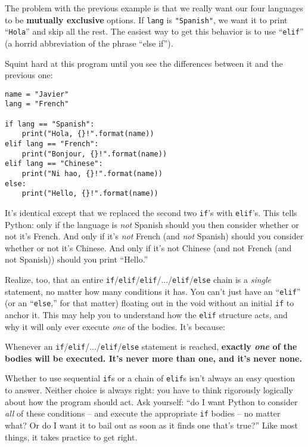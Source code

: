 
The problem with the previous example is that we really want our four languages
to be \textbf{mutually exclusive} options. If \texttt{lang} is
\texttt{"Spanish"}, we want it to print ``\texttt{Hola}'' and skip all the
rest. The easiest way to get this behavior is to use ``\texttt{elif}'' (a
horrid abbreviation of the phrase ``else if'').

Squint hard at this program until you see the differences between it and the
previous one:

\begin{Verbatim}[fontsize=\small,samepage=true,frame=single,framesep=3mm]
name = "Javier"
lang = "French"

if lang == "Spanish":
    print("Hola, {}!".format(name))
elif lang == "French":
    print("Bonjour, {}!".format(name))
elif lang == "Chinese":
    print("Ni hao, {}!".format(name))
else:
    print("Hello, {}!".format(name))
\end{Verbatim}

It's identical except that we replaced the second two \texttt{if}'s with
\texttt{elif}'s. This tells Python: only if the language is \textit{not}
Spanish should you then consider whether or not it's French. And only if it's
\textit{not} French (and \textit{not} Spanish) should you consider whether or
not it's Chinese. And only if it's not Chinese (and not French (and not
Spanish)) should you print ``Hello.''

Realize, too, that an entire
\texttt{if}/\texttt{elif}/\texttt{elif}/.../\texttt{elif}/\texttt{else} chain
is a \textit{single} statement, no matter how many conditions it has. You can't
just have an ``\texttt{elif}'' (or an ``\texttt{else},'' for that matter)
floating out in the void without an initial \texttt{if} to anchor it. This may
help you to understand how the \texttt{elif} structure acts, and why it will
only ever execute \textit{one} of the bodies. It's because:

\begin{shaded}
Whenever an \texttt{if}/\texttt{elif}/.../\texttt{elif}/\texttt{else} statement
is reached, \textbf{exactly \textit{one} of the bodies will be executed. It's
never more than one, and it's never none.}
\end{shaded}

Whether to use sequential \texttt{if}s or a chain of \texttt{elif}s isn't
always an easy question to answer. Neither choice is always right: you have to
think rigorously logically about how the program should act. Ask yourself: ``do
I want Python to consider \textit{all} of these conditions -- and execute the
appropriate \texttt{if} bodies -- no matter what? Or do I want it to bail out
as soon as it finds one that's true?'' Like most things, it takes practice to
get right.

